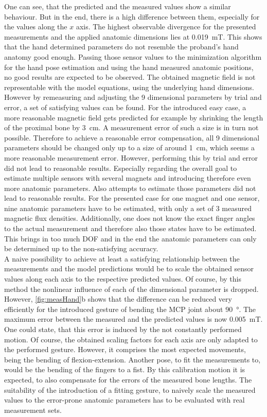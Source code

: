 One can see, that the predicted and the measured values show a similar behaviour. But in the end, there is a high difference between them, especially for the values along the $ x $ axis. The highest observable divergence for the presented measurements and the applied anatomic dimensions lies at \SI{0.019}{\milli \tesla}. This shows that the hand determined parameters do not resemble the proband's hand anatomy good enough. Passing those sensor values to the minimization algorithm for the hand pose estimation and using the hand measured anatomic positions, no good results are expected to be observed. The obtained magnetic field is not representable with the model equations, using the underlying hand dimensions. However by remeasuring and adjusting the 9 dimensional parameters by trial and error, a set of satisfying values can be found. For the introduced easy case, a more reasonable magnetic field gets predicted for example by shrinking the length of the proximal bone by \SI{3}{\cm}. A measurement error of such a size is in turn not possible. Therefore to achieve a reasonable error compensation, all 9 dimensional parameters should be changed only up to a size of around \SI{1}{\cm}, which seems a more reasonable measurement error. However, performing this by trial and error did not lead to reasonable results. Especially regarding the overall goal to estimate multiple sensors with several magnets and introducing therefore even more anatomic parameters. Also attempts to estimate those parameters did not lead to reasonable results. For the presented case for one magnet and one sensor, nine anatomic parameters have to be estimated, with only a set of 3 measured magnetic flux densities. Additionally, one does not know the exact finger angles to the actual measurement and therefore also those states have to be estimated. This brings in too much \ac{DOF} and in the end the anatomic parameters can only be determined up to the non-satisfying accuracy.\\ 
A naive possibility to achieve at least a satisfying relationship between the measurements and the model predictions would be to scale the obtained sensor values along each axis to the respective predicted values. Of course, by this method the nonlinear influence of each of the dimensional parameter is dropped. However, \ref{fig:measHand}b shows that the difference can be reduced very efficiently for the introduced gesture of bending the \ac{MCP} joint about \SI{90}{\degree}. The maximum error between the measured and the predicted values is now \SI{0.005}{\milli \tesla}. One could state, that this error is induced by the not constantly performed motion. Of course, the obtained scaling factors for each axis are only adapted to the performed gesture. However, it comprises the most expected movements, being the bending of flexion-extension. Another pose, to fit the measurements to, would be the bending of the fingers to a fist. By this calibration motion it is expected, to also compensate for the errors of the measured bone lengths. The suitability of the introduction of a fitting gesture, to naively scale the measured values to the error-prone anatomic parameters has to be evaluated with real measurement sets.


